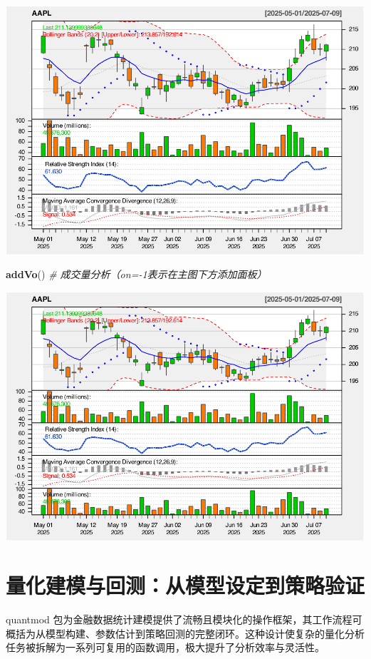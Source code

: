 \documentclass[]{ctexbook}
\newenvironment{Shaded}{\begin{snugshade}}{\end{snugshade}}
\newcommand{\CommentTok}[1]{\textcolor[rgb]{0.56,0.35,0.01}{\textit{#1}}}
\newcommand{\FunctionTok}[1]{\textcolor[rgb]{0.13,0.29,0.53}{\textbf{#1}}}
\newcommand{\NormalTok}[1]{#1}
\begin{document}
\includegraphics[width=0.9\linewidth]{quantmod_files/figure-latex/comprehensive-7}

\begin{Shaded}
\begin{Highlighting}[]
\FunctionTok{addVo}\NormalTok{()  }\CommentTok{\# 成交量分析（on={-}1表示在主图下方添加面板）}
\end{Highlighting}
\end{Shaded}

\includegraphics[width=0.9\linewidth]{quantmod_files/figure-latex/comprehensive-8}

\chapter{量化建模与回测：从模型设定到策略验证}\label{model}

quantmod 包为金融数据统计建模提供了流畅且模块化的操作框架，其工作流程可概括为从模型构建、参数估计到策略回测的完整闭环。这种设计使复杂的量化分析任务被拆解为一系列可复用的函数调用，极大提升了分析效率与灵活性。
\end{document}
